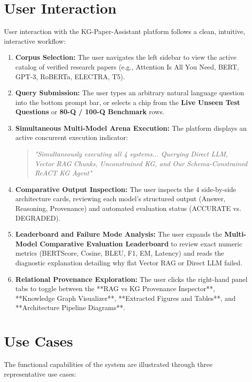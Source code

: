 \section{User Interaction}
User interaction with the KG-Paper-Assistant platform follows a clean, intuitive, interactive workflow:
\begin{enumerate}
    \item \textbf{Corpus Selection:} The user navigates the left sidebar to view the active catalog of verified research papers (e.g., Attention Is All You Need, BERT, GPT-3, RoBERTa, ELECTRA, T5).
    \item \textbf{Query Submission:} The user types an arbitrary natural language question into the bottom prompt bar, or selects a chip from the \textbf{Live Unseen Test Questions} or \textbf{80-Q / 100-Q Benchmark} rows.
    \item \textbf{Simultaneous Multi-Model Arena Execution:} The platform displays an active concurrent execution indicator:
    \begin{quote}
        \textit{"Simultaneously executing all 4 systems... Querying Direct LLM, Vector RAG Chunks, Unconstrained KG, and Our Schema-Constrained ReACT KG Agent"}
    \end{quote}
    \item \textbf{Comparative Output Inspection:} The user inspects the 4 side-by-side architecture cards, reviewing each model's structured output (Answer, Reasoning, Provenance) and automated evaluation status (ACCURATE vs. DEGRADED).
    \item \textbf{Leaderboard and Failure Mode Analysis:} The user expands the \textbf{Multi-Model Comparative Evaluation Leaderboard} to review exact numeric metrics (BERTScore, Cosine, BLEU, F1, EM, Latency) and reads the diagnostic explanation detailing why flat Vector RAG or Direct LLM failed.
    \item \textbf{Relational Provenance Exploration:} The user clicks the right-hand panel tabs to toggle between the **RAG vs KG Provenance Inspector**, **Knowledge Graph Visualizer**, **Extracted Figures and Tables**, and **Architecture Pipeline Diagrams**.
\end{enumerate}

\section{Use Cases}
The functional capabilities of the system are illustrated through three representative use cases:

